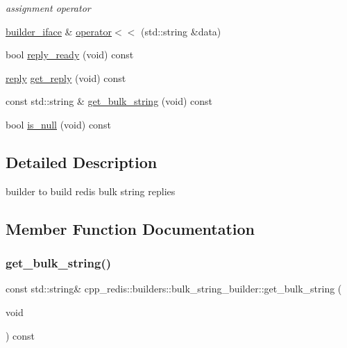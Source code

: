 \begin{DoxyCompactItemize}
\begin{DoxyCompactList}\small\item\em assignment operator \end{DoxyCompactList}\item 
\hyperlink{classcpp__redis_1_1builders_1_1builder__iface}{builder\+\_\+iface} \& \hyperlink{classcpp__redis_1_1builders_1_1bulk__string__builder_a43000357f87212f657aafe279a92b541}{operator$<$$<$} (std\+::string \&data)
\item 
bool \hyperlink{classcpp__redis_1_1builders_1_1bulk__string__builder_a4d80d8dfe305e35aca8b4ec84c56fbea}{reply\+\_\+ready} (void) const
\item 
\hyperlink{classcpp__redis_1_1reply}{reply} \hyperlink{classcpp__redis_1_1builders_1_1bulk__string__builder_a56d6d3089107a1bccd63f6a5267c16cb}{get\+\_\+reply} (void) const
\item 
const std\+::string \& \hyperlink{classcpp__redis_1_1builders_1_1bulk__string__builder_a6b3e70acab5c115609db774becbcc571}{get\+\_\+bulk\+\_\+string} (void) const
\item 
bool \hyperlink{classcpp__redis_1_1builders_1_1bulk__string__builder_a2a6ab893dbe5ad2433df18ce62ca6211}{is\+\_\+null} (void) const
\end{DoxyCompactItemize}


\subsection{Detailed Description}
builder to build redis bulk string replies 

\subsection{Member Function Documentation}
\mbox{\label{classcpp__redis_1_1builders_1_1bulk__string__builder_a6b3e70acab5c115609db774becbcc571}} 
\subsubsection{\texorpdfstring{get\+\_\+bulk\+\_\+string()}{get\_bulk\_string()}}
{\footnotesize\ttfamily const std\+::string\& cpp\+\_\+redis\+::builders\+::bulk\+\_\+string\+\_\+builder\+::get\+\_\+bulk\+\_\+string (\begin{DoxyParamCaption}\item[{void}]{ }\end{DoxyParamCaption}) const}

